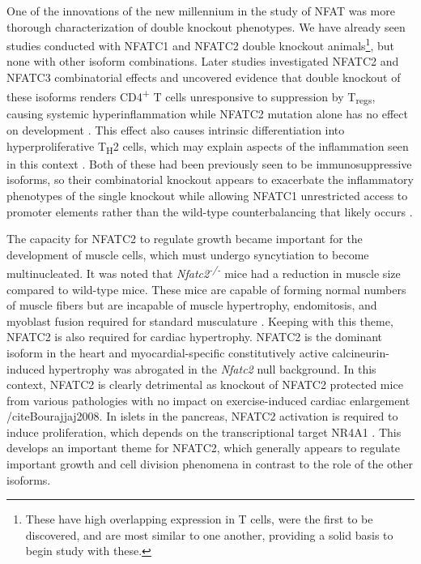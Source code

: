 One of the innovations of the new millennium in the study of NFAT was more thorough characterization of double knockout phenotypes. We have already seen studies conducted with NFATC1 and NFATC2 double knockout animals\footnote{These have high overlapping expression in T cells, were the first to be discovered, and are most similar to one another, providing a solid basis to begin study with these.}, but none with other isoform combinations. Later studies investigated NFATC2 and NFATC3 combinatorial effects and uncovered evidence that double knockout of these isoforms renders CD4\textsuperscript{+} T cells unresponsive to suppression by T\textsubscript{regs}, causing systemic hyperinflammation \citep{Bopp2005} while NFATC2 mutation alone has no effect on development \citep{CanteBarrett2007}. This effect also causes intrinsic differentiation into hyperproliferative T\textsubscript{H}2 cells, which may explain aspects of the inflammation seen in this context \citep{Rengarajan2001, Ranger1998b}. Both of these had been previously seen to be immunosuppressive isoforms, so their combinatorial knockout appears to exacerbate the inflammatory phenotypes of the single knockout \citep{Oukka1998, Hodge1996} while allowing NFATC1 unrestricted access to promoter elements rather than the wild-type counterbalancing that likely occurs \citep{Ranger1998b}. 

The capacity for NFATC2 to regulate growth became important for the development of muscle cells, which must undergo syncytiation to become multinucleated. It was noted that \textit{Nfatc2\textsuperscript{-/-}} mice had a reduction in muscle size compared to wild-type mice. These mice are capable of forming normal numbers of muscle fibers but are incapable of muscle hypertrophy, endomitosis, and myoblast fusion required for standard musculature \citep{Horsley2001, Pavlath2003}. Keeping with this theme, NFATC2 is also required for cardiac hypertrophy. NFATC2 is the dominant isoform in the heart and myocardial-specific constitutively active calcineurin-induced hypertrophy was abrogated in the \textit{Nfatc2} null background. In this context, NFATC2 is clearly detrimental as knockout of NFATC2 protected mice from various pathologies with no impact on exercise-induced cardiac enlargement /cite{Bourajjaj2008}. In \textbeta{} islets in the pancreas, NFATC2 activation is required to induce proliferation, which depends on the transcriptional target NR4A1 \citep{Simonett2021}. This develops an important theme for NFATC2, which generally appears to regulate important growth and cell division phenomena in contrast to the role of the other isoforms.


